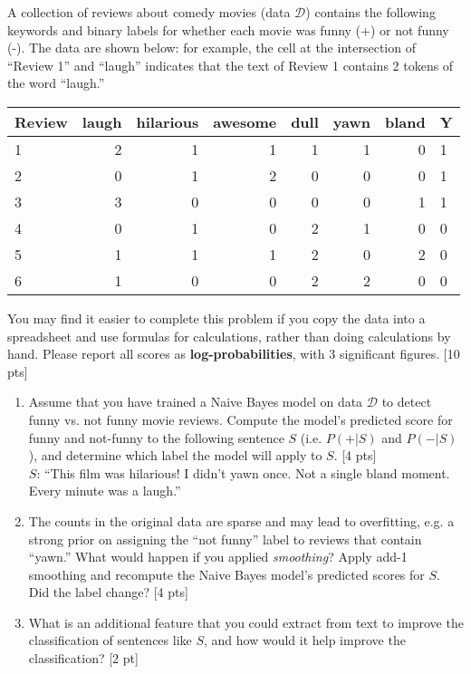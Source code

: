 A collection of reviews about comedy movies (data $\mathcal{D}$) contains the following keywords and binary labels for whether each movie was funny (+) or not funny (-). 
The data are shown below: for example, the cell at the intersection of ``Review 1'' and ``laugh'' indicates that the text of Review 1 contains 2 tokens of the word ``laugh.''

\begin{table}[h!]
\centering
\small
\begin{tabular}{l | r r r r r r | l} \toprule
Review & laugh & hilarious & awesome & dull & yawn & bland & Y \\ \hline
1      & 2     & 1         & 1       & 1    & 1    & 0     & 1 \\
2      & 0     & 1         & 2       & 0    & 0    & 0     & 1 \\
3      & 3     & 0         & 0       & 0    & 0    & 1     & 1 \\
4      & 0     & 1         & 0       & 2    & 1    & 0     & 0 \\
5      & 1     & 1         & 1       & 2    & 0    & 2     & 0 \\
6      & 1     & 0         & 0       & 2    & 2    & 0     & 0 \\ \bottomrule
\end{tabular}
\end{table}

You may find it easier to complete this problem if you copy the data into a spreadsheet and use formulas for calculations, rather than doing calculations by hand. 
Please report all scores as \textbf{log-probabilities}, with 3 significant figures. [10 pts]\\

\begin{enumerate}
\item Assume that you have trained a Naive Bayes model on data $\mathcal{D}$ to detect funny vs. not funny movie reviews. 
Compute the model's predicted score for funny and not-funny to the following sentence $S$ (i.e. $P(+ | S)$ and $P(- | S)$), and determine which label the model will apply to $S$. [4 pts] \\ 
$S$: ``This film was hilarious! I didn't yawn once. Not a single bland moment. Every minute was a laugh.''
\item The counts in the original data are sparse and may lead to overfitting, e.g. a strong prior on assigning the ``not funny'' label to reviews that contain ``yawn.''
What would happen if you applied \emph{smoothing}?
Apply add-1 smoothing and recompute the Naive Bayes model's predicted scores for $S$.
Did the label change?
[4 pts]
\item What is an additional feature that you could extract from text to improve the classification of sentences like $S$, and how would it help improve the classification?
[2 pt]
\end{enumerate}

